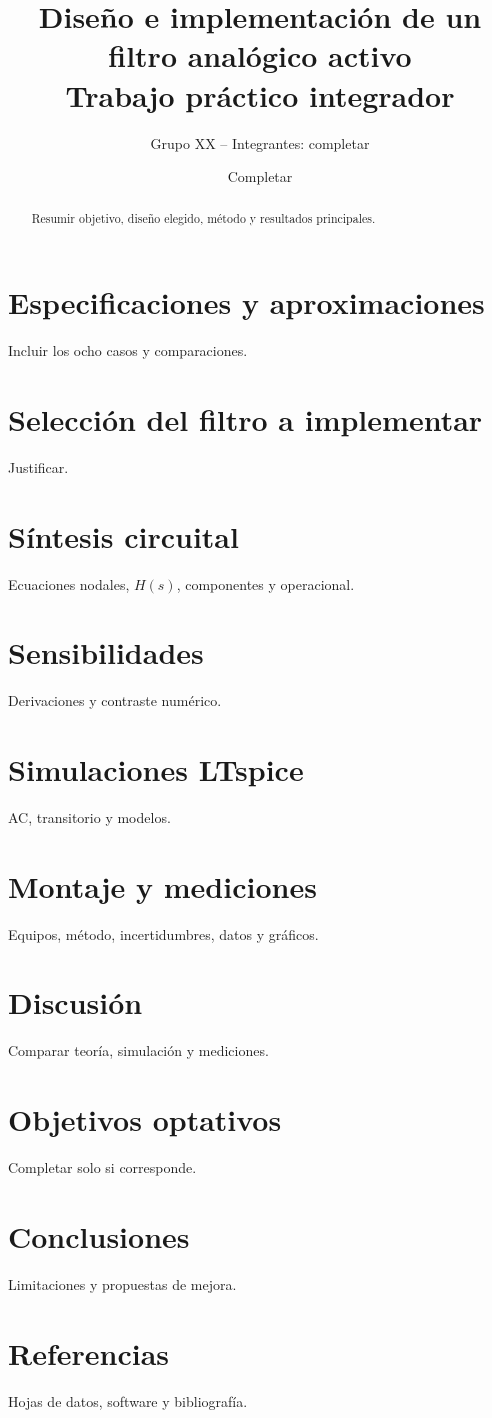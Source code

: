 \documentclass[11pt,a4paper]{article}
\title{Diseño e implementación de un filtro analógico activo\\\large Trabajo práctico integrador}
\author{Grupo XX -- Integrantes: completar}
\date{Completar}
\begin{document}
\maketitle
\begin{abstract}Resumir objetivo, diseño elegido, método y resultados principales.\end{abstract}
\section{Especificaciones y aproximaciones} Incluir los ocho casos y comparaciones.
\section{Selección del filtro a implementar} Justificar.
\section{Síntesis circuital} Ecuaciones nodales, $H(s)$, componentes y operacional.
\section{Sensibilidades} Derivaciones y contraste numérico.
\section{Simulaciones LTspice} AC, transitorio y modelos.
\section{Montaje y mediciones} Equipos, método, incertidumbres, datos y gráficos.
\section{Discusión} Comparar teoría, simulación y mediciones.
\section{Objetivos optativos} Completar solo si corresponde.
\section{Conclusiones} Limitaciones y propuestas de mejora.
\section{Referencias} Hojas de datos, software y bibliografía.
\end{document}
